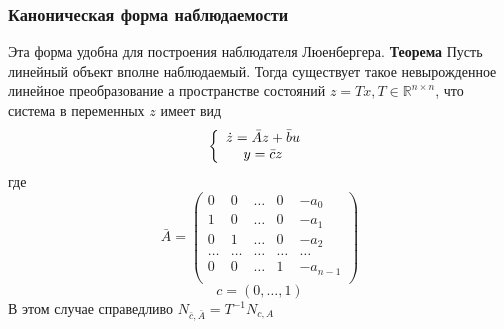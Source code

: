 \documentclass[A4]{article}
\begin{document}
\subsubsection{Каноническая форма наблюдаемости}
Эта форма удобна для построения наблюдателя Люенбергера.
\textbf{Теорема} Пусть линейный объект вполне наблюдаемый. Тогда существует такое невырожденное линейное преобразование а пространстве состояний $z=Tx,T\in\mathbb{R}^{n\times n}$, что система в переменных $z$ имеет вид 
\begin{equation}
\left\{\begin{array}{cc}
\dot{z}=\bar{A}z+\bar{b}u\\
y=\bar{c}z
\end{array}\right.\\
\end{equation}
где
\begin{equation} 
\bar{A}=\left(\begin{array}{ccccc}
0&0&\ldots&0&-a_0\\
1&0&\ldots&0&-a_1\\
0&1&\ldots&0&-a_2\\
\ldots&\ldots&\ldots&\ldots&\ldots\\
0&0&\ldots&1&-a_{n-1}\\
\end{array}\right)
\end{equation}
\begin{equation*}
c=(0,\ldots,1)
\end{equation*}
В этом случае справедливо $N_{\bar{c},\bar{A}}=T^{-1}N_{c,A}$
\end{document}
